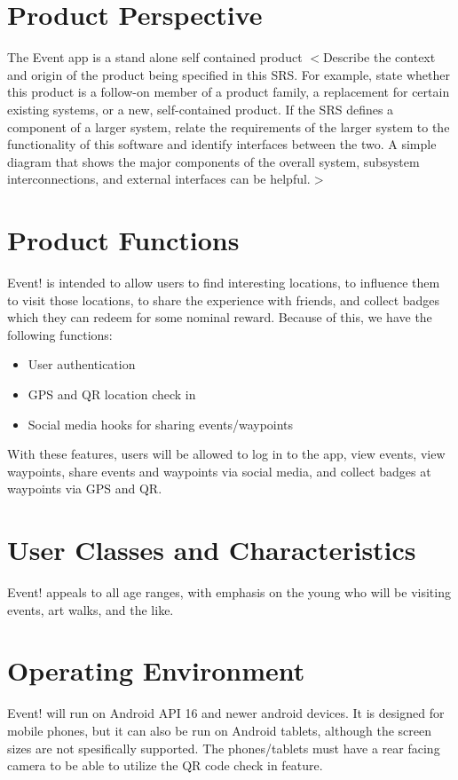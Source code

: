 \documentclass{scrreprt}
\begin{document}
\section{Product Perspective}
The Event app is a stand alone self contained product
$<$Describe the context and origin of the product being specified in this SRS.  
For example, state whether this product is a follow-on member of a product 
family, a replacement for certain existing systems, or a new, self-contained 
product. If the SRS defines a component of a larger system, relate the 
requirements of the larger system to the functionality of this software and 
identify interfaces between the two. A simple diagram that shows the major 
components of the overall system, subsystem interconnections, and external 
interfaces can be helpful.$>$

\section{Product Functions}
Event! is intended to allow users to find interesting locations, to influence them 
to visit those locations, to share the experience with friends, and collect badges 
which they can redeem for some nominal reward. Because of this, we have the 
following functions: 
\begin{itemize}
\item User authentication
\item GPS and QR location check in
\item Social media hooks for sharing events/waypoints
\end{itemize}
With these features, users will be allowed to log in to the app, view events, 
view waypoints, share events and waypoints via social media, and collect 
badges at waypoints via GPS and QR.

\section{User Classes and Characteristics}
Event! appeals to all age ranges, with emphasis on the young who will be visiting 
events, art walks, and the like.

\section{Operating Environment}
Event! will run on Android API 16 and newer android devices. It is designed for 
mobile phones, but it can also be run on Android tablets, although the screen 
sizes are not spesifically supported. The phones/tablets must have a rear facing 
camera to be able to utilize the QR code check in feature.
\end{document}
